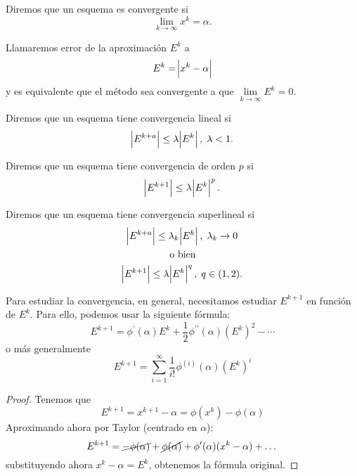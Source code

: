 \begin{defi}
    Diremos que un esquema es convergente si
    \[
        \lim_{k \to \infty} x^k = \alpha.
    \]
\end{defi}

\begin{obs}
    Llamaremos error de la aproximación $E^k$ a 
    \[
        E^k = \abs{x^k - \alpha}
    \]
    y es equivalente que el método sea convergente a que $\lim\limits_{k \to \infty} E^k = 0$.
\end{obs}

\begin{defi}
    Diremos que un esquema tiene convergencia lineal si
    \[
        \abs{E^{k+a}} \leq \lambda \abs{E^k}, \; \lambda < 1.
    \]
\end{defi}

\begin{defi}
    Diremos que un esquema tiene convergencia de orden $p$ si
    \[
        \abs{E^{k+1}} \leq \lambda \abs{E^k}^p.
    \]
\end{defi}

\begin{defi}
    Diremos que un esquema tiene convergencia superlineal si
    \begin{gather*}
        \abs{E^{k+a}} \leq \lambda_k \abs{E^k}, \; \lambda_k \to 0 \\
        \text{o bien} \\
        \abs{E^{k+1}} \leq \lambda \abs{E^k}^q, \; q \in (1, 2).
    \end{gather*}
\end{defi}

\begin{prop}
    Para estudiar la convergencia, en general, necesitamos estudiar $E^{k+1}$ en función de $E^k$.
    Para ello, podemos usar la siguiente fórmula:
    \[
        E^{k+1} = \phi^\prime(\alpha)E^k + \frac{1}{2} \phi^{\prime \prime}(\alpha)\left( E^k \right)^2 - \cdots
    \]
    o más generalmente
    \[
        E^{k+1} = \sum^{\infty}_{i = 1} \frac{1}{i!} \phi^{(i)}(\alpha) \left( E^k \right)^i
    \]
\end{prop}

\begin{proof}
    Tenemos que
    \[
        E^{k+1} = x^{k+1} - \alpha = \phi(x^k) - \phi(\alpha)
    \]
    Aproximando ahora por Taylor (centrado en $\alpha$):
    \[
        E^{k+1} = \cancel{-\phi(\alpha)} + \cancel{\phi(\alpha)} + \phi^\prime(\alpha)(x^k - \alpha) + \dots
    \]
    substituyendo ahora $x^k - \alpha = E^k$, obtenemos la fórmula original.
\end{proof}

